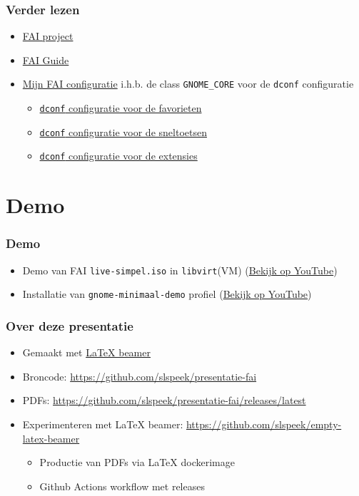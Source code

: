 \documentclass{beamer}
\newcommand{\reponame}{presentatie-fai}
\begin{document}
\begin{frame}
\frametitle{Verder lezen}
\begin{itemize}
  \item \href{https://fai-project.org/}{FAI project}
  \item \href{https://fai-project.org/fai-guide/}{FAI Guide}
  \item \href{https://github.com/slspeek/fai/}{Mijn FAI configuratie} i.h.b. 
  de class \texttt{GNOME\_CORE} voor de \texttt{dconf} configuratie
  \begin{itemize}
    \item \href{https://github.com/slspeek/fai/blob/main/files/etc/dconf/db/local.d/00-favorite-apps/DEVELOPER}{\texttt{dconf} configuratie voor de favorieten}
    \item \href{https://github.com/slspeek/fai/blob/main/files/etc/dconf/db/local.d/10-shortcuts/GNOME_CORE}{\texttt{dconf} configuratie voor de sneltoetsen}
    \item \href{https://github.com/slspeek/fai/blob/main/files/etc/dconf/db/local.d/40-gnome-extensions/GNOME_EXTENSIONS}{\texttt{dconf} configuratie voor de extensies}
  \end{itemize}
  \end{itemize}
\end{frame}

\section{Demo}
\begin{frame}
\frametitle{Demo}
\begin{itemize}
  \item Demo van FAI \texttt{live-simpel.iso} in \texttt{libvirt}(VM) (\href{https://youtu.be/4j1Wtoy2kK8}{Bekijk op YouTube})
  \item Installatie van \texttt{gnome-minimaal-demo} profiel (\href{https://youtu.be/CE_PjYTGtjc}{Bekijk op YouTube})
\end{itemize}
\end{frame}

\begin{frame}
\frametitle{Over deze presentatie}
\begin{itemize}
  \item Gemaakt met \href{https://nl.mirrors.cicku.me/ctan/macros/latex/contrib/beamer/doc/beameruserguide.pdf}{\LaTeX{} beamer}
  \item Broncode: \url{https://github.com/slspeek/\reponame}
  \item PDFs: \url{https://github.com/slspeek/\reponame/releases/latest}
  \item Experimenteren met \LaTeX{} beamer: \url{https://github.com/slspeek/empty-latex-beamer}
  \begin{itemize}
    \item Productie van PDFs via \LaTeX{} dockerimage
    \item Github Actions workflow met releases
  \end{itemize}
\end{itemize}
\end{frame}
\end{document}
